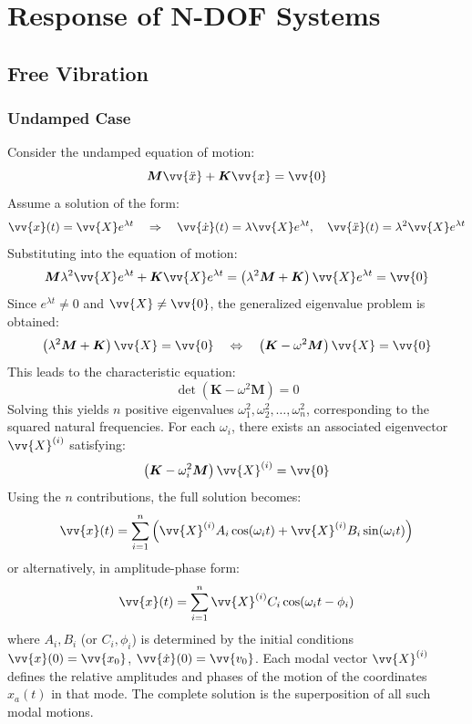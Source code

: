 
\chapter{Response of N-DOF Systems}

\section{Free Vibration}

\subsection{Undamped Case}

Consider the undamped equation of motion:
\[
\boldsymbol{M} \vv{\ddot{x}} + \boldsymbol{K} \vv{x} = \vv{0}
\]
Assume a solution of the form:
\[
\vv{x}(t) = \vv{X}  e^{\lambda t} \quad \Rightarrow \quad \vv{\dot{x}}(t) = \lambda \vv{X} e^{\lambda t}, \quad \vv{\ddot{x}}(t) = \lambda^2 \vv{X} e^{\lambda t}
\]
Substituting into the equation of motion:
\[
\boldsymbol{M} \lambda^2 \vv{X} e^{\lambda t} + \boldsymbol{K} \vv{X} e^{\lambda t} = \left( \lambda^2 \boldsymbol{M} + \boldsymbol{K} \right) \vv{X} e^{\lambda t} = \vv{0}
\]
Since \( e^{\lambda t} \neq 0 \) and \( \vv{X} \neq \vv{0} \), the generalized eigenvalue problem is obtained:
\[
\left( \lambda^2 \boldsymbol{M} + \boldsymbol{K} \right) \vv{X} = \vv{0}
\quad \Leftrightarrow \quad
\left( \boldsymbol{K} - \omega^2 \boldsymbol{M} \right) \vv{X} = \vv{0}
\]
This leads to the characteristic equation:
\[
\det( \boldsymbol{K} - \omega^2 \boldsymbol{M} ) = 0
\]
Solving this yields \( n \) positive eigenvalues \( \omega_1^2, \omega_2^2, \dots, \omega_n^2 \), corresponding to the squared natural frequencies. For each \( \omega_i \), there exists an associated eigenvector \( \vv{X}^{(i)} \) satisfying:
\[
\left( \boldsymbol{K} - \omega_i^2 \boldsymbol{M} \right) \vv{X}^{(i)} = \vv{0}
\]
Using the \( n \) contributions, the full solution becomes:
\[
\vv{x}(t) = \sum_{i=1}^{n} \left( \vv{X}^{(i)} A_i \cos(\omega_i t) + \vv{X}^{(i)} B_i \sin(\omega_i t) \right)
\]
or alternatively, in amplitude-phase form:
\[
\vv{x}(t) = \sum_{i=1}^{n} \vv{X}^{(i)} C_i \cos(\omega_i t - \phi_i)
\]
where \( A_i, B_i \) (or \( C_i, \phi_i \)) is determined by the initial conditions \( \vv{x}(0) = \vv{x_0} \), \( \vv{\dot{x}}(0) = \vv{v_0} \). Each modal vector \( \vv{X}^{(i)} \) defines the relative amplitudes and phases of the motion of the coordinates \( x_a(t) \) in that mode. The complete solution is the superposition of all such modal motions.

